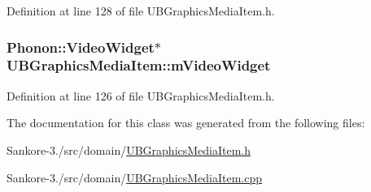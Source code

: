 Definition at line 128 of file U\-B\-Graphics\-Media\-Item.\-h.

\hypertarget{class_u_b_graphics_media_item_aa64eaf00cd632a1d8eca70ccd6a61029}{
\subsubsection[{m\-Video\-Widget}]{\setlength{\rightskip}{0pt plus 5cm}Phonon\-::\-Video\-Widget$\ast$ U\-B\-Graphics\-Media\-Item\-::m\-Video\-Widget\hspace{0.3cm}{\ttfamily [protected]}}}\label{dc/d5a/class_u_b_graphics_media_item_aa64eaf00cd632a1d8eca70ccd6a61029}


Definition at line 126 of file U\-B\-Graphics\-Media\-Item.\-h.



The documentation for this class was generated from the following files\-:\begin{DoxyCompactItemize}
\item 
Sankore-\/3./src/domain/\hyperlink{_u_b_graphics_media_item_8h}{U\-B\-Graphics\-Media\-Item.\-h}\item 
Sankore-\/3./src/domain/\hyperlink{_u_b_graphics_media_item_8cpp}{U\-B\-Graphics\-Media\-Item.\-cpp}\end{DoxyCompactItemize}
